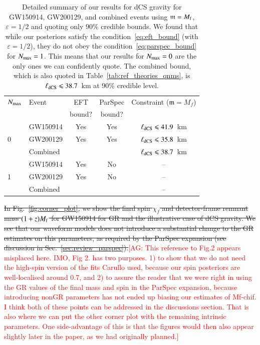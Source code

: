 \documentclass[twocolumn,
               prd,
               aps,
               superscriptaddress,
               tightenlines,
               nofootinbib,
               eqsecnum,
               amsfonts,
               amsmath,
               longbibliography]{revtex4-1}
\newcommand{\gm}{\mathfrak{m}}
\newcommand{\agcomm}[1]{{\textcolor{red}{{[AG: #1]}}}}
\begin{document}
\begin{table}[h]
\begin{tabular}{l l c c c}
\hline
\hline
$N_{\rm max}$ & Event & EFT    & ParSpec & Constraint ($\gm = M_{f}$) \\
              &       & bound? & bound?  &                            \\
\hline
      & GW150914 & Yes & Yes & $\ell_{\rm dCS} \leqslant 41.9$~km \\
0     & GW200129 & Yes & Yes & $\ell_{\rm dCS} \leqslant 35.8$~km \\
      & Combined &     &     & \cellcolor{black!10}$\ell_{\rm dCS} \leqslant 38.7$~km \\
\hline
      & GW150914 & Yes & No  & --                                 \\
1     & GW200129 & Yes & No  & --                                 \\
      & Combined &     &     & --                                 \\
\hline
\hline
\end{tabular}
\caption{Detailed summary of our results for dCS gravity for GW150914, GW200129, and
combined events using $\gm = M_{\rm f}$, $\varepsilon = 1/2$ and quoting only 90\% credible bounds.
%
We found that while our posteriors satisfy the condition~\eqref{eq:eft_bound} (with $\varepsilon = 1/2$),
they do not obey the condition~\eqref{eq:parspec_bound} for $N_{\rm max} = 1$. This means
that our results for $N_{\rm max}=0$ are the only ones we can confidently quote.
%
The combined bound, which is also quoted in Table~\ref{tab:ref_theories_qnms},
is $\ell_{\rm dCS} \leqslant 38.7$~km at 90\% credible level.
}
\label{tab:summary_dcs}
\end{table}

\sout{In Fig.~\ref{fig:corner_plot}, we show the final spin $\chi_f$ and
detector-frame remnant mass $(1 + z) M_{\rm f}$ for GW150914 for GR and the
illustrative case of dCS gravity. We see that our waveform models does not
introduce a substantial change to the GR estimates on this parameters, as
required by the ParSpec expansion (see discussion in
Sec.~\ref{sec:review_parspec}).}\agcomm{This reference to Fig.2 appears misplaced here. IMO, Fig 2. has two purposes. 1) to show that we do not need the high-spin version of the fits Carullo used, because our spin posteriors are well-localised around 0.7, and 2) to assure the reader that we were right in using the GR values of the final mass and spin in the ParSpec expansion, because introducing nonGR parameters has not ended up biasing our estimates of Mf-chif.  I think both of these points can be addressed in the discussions section. That is also where we can put the other corner plot with the remaining intrinsic parameters. One side-advantage of this is that the figures would then also appear slightly later in the paper, as we had originally planned.}
%
\end{document}
